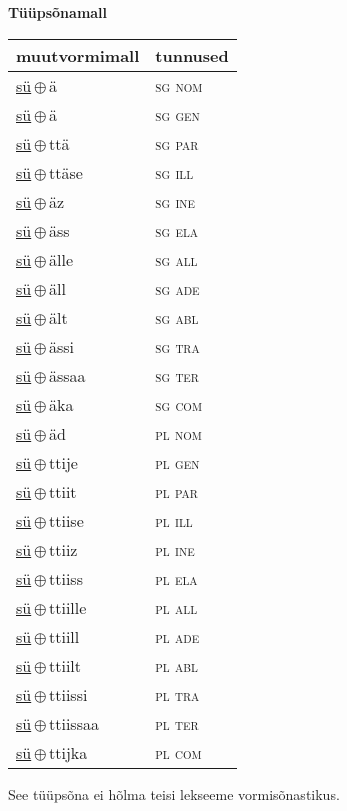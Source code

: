 

\vspace{3.5em}
\noindent \begin{minipage}{\textwidth}
\noindent \textbf{Tüüpsõnamall \,}\\

\begin{sideways}
\begin{tabular}{l l}
muutvormimall & tunnused \\
\hline
\underline{sü}\,$\oplus$\,ä & \textsc{ sg nom } \\
\underline{sü}\,$\oplus$\,ä & \textsc{ sg gen } \\
\underline{sü}\,$\oplus$\,ttä & \textsc{ sg par } \\
\underline{sü}\,$\oplus$\,ttäse & \textsc{ sg ill } \\
\underline{sü}\,$\oplus$\,äz & \textsc{ sg ine } \\
\underline{sü}\,$\oplus$\,äss & \textsc{ sg ela } \\
\underline{sü}\,$\oplus$\,älle & \textsc{ sg all } \\
\underline{sü}\,$\oplus$\,äll & \textsc{ sg ade } \\
\underline{sü}\,$\oplus$\,ält & \textsc{ sg abl } \\
\underline{sü}\,$\oplus$\,ässi & \textsc{ sg tra } \\
\underline{sü}\,$\oplus$\,ässaa & \textsc{ sg ter } \\
\underline{sü}\,$\oplus$\,äka & \textsc{ sg com } \\
\underline{sü}\,$\oplus$\,äd & \textsc{ pl nom } \\
\underline{sü}\,$\oplus$\,ttije & \textsc{ pl gen } \\
\underline{sü}\,$\oplus$\,ttiit & \textsc{ pl par } \\
\underline{sü}\,$\oplus$\,ttiise & \textsc{ pl ill } \\
\underline{sü}\,$\oplus$\,ttiiz & \textsc{ pl ine } \\
\underline{sü}\,$\oplus$\,ttiiss & \textsc{ pl ela } \\
\underline{sü}\,$\oplus$\,ttiille & \textsc{ pl all } \\
\underline{sü}\,$\oplus$\,ttiill & \textsc{ pl ade } \\
\underline{sü}\,$\oplus$\,ttiilt & \textsc{ pl abl } \\
\underline{sü}\,$\oplus$\,ttiissi & \textsc{ pl tra } \\
\underline{sü}\,$\oplus$\,ttiissaa & \textsc{ pl ter } \\
\underline{sü}\,$\oplus$\,ttijka & \textsc{ pl com } \\
\end{tabular}
\end{sideways}
\label{tab:tüüpsõnamall-süä}

\end{minipage}

 
\vspace{1em}
\noindent See tüüpsõna ei hõlma teisi lekseeme vormi\-sõnastikus.
